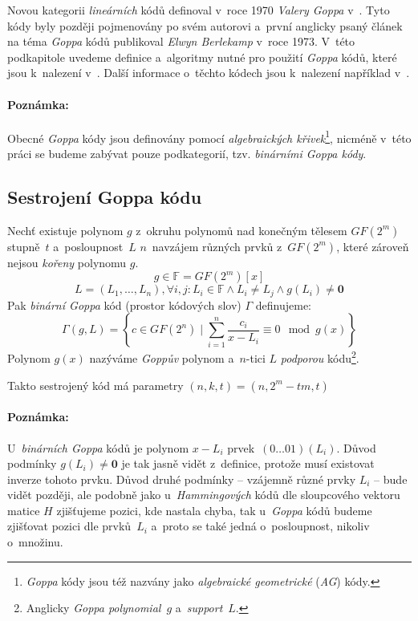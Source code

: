 \documentclass[thesis=M,czech,hidelinks]{FITthesis}[2012/06/26]
\newcommand{\0}{{\textcolor[gray]{0.75}{0}}}
\begin{document}
Novou kategorii \emph{lineárních} kódů definoval v~roce 1970 \emph{Valery Goppa}
v~\cite{Goppa}. Tyto kódy byly později pojmenovány po svém autorovi a~první
anglicky psaný článek na téma \emph{Goppa} kódů publikoval \emph{Elwyn
Berlekamp} v~roce 1973. V~této podkapitole uvedeme definice a~algoritmy nutné
pro použití \emph{Goppa} kódů, které jsou k~nalezení
v~\cite{Berlekamp2,Engelbert}. Další informace o~těchto kódech jsou k~nalezení
například v~\cite{McEliece_coding}.

\paragraph{Poznámka:} Obecné \emph{Goppa} kódy jsou definovány pomocí
\emph{algebraických křivek}\footnote{
    \emph{Goppa} kódy jsou též nazvány jako \emph{algebraické geometrické}
    (\emph{AG}) kódy.
}, nicméně v~této práci se budeme zabývat pouze podkategorií, tzv.
\emph{binárními Goppa kódy}.


\subsection{Sestrojení Goppa kódu}

Nechť existuje polynom $g$ z~okruhu polynomů nad konečným tělesem $GF(2^m)$
stupně~$t$ a~posloupnost~$L$ $n$~navzájem různých prvků z~$GF(2^m)$, které
zároveň nejsou \emph{kořeny} polynomu $g$.
$$ g \in \mathbb{F} = GF(2^m)[x] $$
$$
    L = \left( L_1, \ldots, L_n \right),
        \forall i,j : L_i \in \mathbb{F} \land L_i \neq L_j \land g(L_i) \neq \mathbf{0}
$$
Pak \emph{binární Goppa} kód (prostor kódových slov) $\Gamma$ definujeme:
$$
    \Gamma(g,L) =
        \left\{
            c \in GF(2^n)
            \;|\;
            \sum_{i=1}^{n} \frac{c_i}{x - L_i} \equiv 0 \mod g(x)
        \right\}
$$
Polynom $g(x)$ nazýváme \emph{Goppův}
polynom a~$n$-tici $L$ \emph{podporou} kódu\footnote{
    Anglicky \emph{Goppa polynomial}~$g$ a~\emph{support}~$L$.
}.

Takto sestrojený kód má parametry $(n,k,t) = (n,2^m-tm,t)$

\paragraph{Poznámka:} U~\emph{binárních Goppa} kódů je polynom $x - L_i$
prvek~$(0\ldots01)(L_i)$. Důvod podmínky $g(L_i) \neq \mathbf{0}$ je tak jasně
vidět z~definice, protože musí existovat inverze tohoto prvku. Důvod druhé
podmínky -- vzájemně různé prvky $L_i$ -- bude vidět později, ale podobně jako
u~\emph{Hammingových} kódů dle sloupcového vektoru matice $H$ zjišťujeme pozici,
kde nastala chyba, tak u~\emph{Goppa} kódů budeme zjišťovat pozici dle
prvků~$L_i$ a~proto se také jedná o~posloupnost, nikoliv o~množinu.
\end{document}
